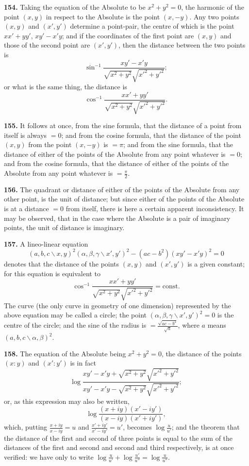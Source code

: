 \documentclass[11pt,a4paper]{book}
\begin{document}
\begin{center}
\textbf{154.} Taking the equation of the Absolute to be $x^2+y^2=0$, the harmonic of
the point $(x,y)$ in respect to the Absolute is the point $(x,-y)$. Any two points
$(x,y)$ and $(x',y')$ determine a point-pair, the centre of which is the point
$xx'+yy'$, $xy'-x'y$; and if the coordinates of the first point are $(x,y)$ and those of the
second point are $(x',y')$, then the distance between the two points is
\[
\sin^{-1}\frac{xy'-x'y}{\sqrt{x^2+y^2}\sqrt{x'^2+y'^2}};
\]
or what is the same thing, the distance is
\[
\cos^{-1}\frac{xx'+yy'}{\sqrt{x^2+y^2}\sqrt{x'^2+y'^2}}.
\]

\textbf{155.} It follows at once, from the sine formula, that the distance of a point
from itself is always $=0$; and from the cosine formula, that the distance of the point
$(x,y)$ from the point $(x,-y)$ is $=\pi$; and from the sine formula, that the distance
of either of the points of the Absolute from any point whatever is $=0$; and from the
cosine formula, that the distance of either of the points of the Absolute from any point
whatever is $=\frac{\pi}{2}$.

\textbf{156.} The quadrant or distance of either of the points of the Absolute from any
other point, is the unit of distance; but since either of the points of the Absolute is at
a distance $=0$ from itself, there is here a certain apparent inconsistency. It may be
observed, that in the case where the Absolute is a pair of imaginary points, the unit of
distance is imaginary.

\textbf{157.} A lineo-linear equation
\[
(a,b,c\!\backslash x,y)^2(\alpha,\beta,\gamma\!\backslash x',y')^2-(ac-b^2)(xy'-x'y)^2=0
\]
denotes that the distance of the points $(x,y)$ and $(x',y')$ is a given constant; for this
equation is equivalent to
\[
\cos^{-1}\frac{xx'+yy'}{\sqrt{x^2+y^2}\sqrt{x'^2+y'^2}}=\text{const.}
\]
The curve (the only curve in geometry of one dimension) represented by the above
equation may be called a circle; the point $(\alpha,\beta,\gamma\!\backslash x',y')^2=0$ is the centre of the circle;
and the sine of the radius is $=\frac{\sqrt{ac-b^2}}{\sqrt{a}}$, where $a$ means $(a,b,c\!\backslash \alpha,\beta)^2$.

\textbf{158.} The equation of the Absolute being $x^2+y^2=0$, the distance of the points
$(x:y)$ and $(x':y')$ is in fact
\[
\log\frac{xy'-x'y+\sqrt{x^2+y^2}\sqrt{x'^2+y'^2}}{xy'-x'y-\sqrt{x^2+y^2}\sqrt{x'^2+y'^2}};
\]
or, as this expression may also be written,
\[
\log\frac{(x+iy)(x'-iy')}{(x-iy)(x'+iy')},
\]
which, putting $\frac{x+iy}{x-iy}=u$ and $\frac{x'+iy'}{x'-iy'}=u'$, becomes $\log\frac{u}{u'}$; and the theorem that
the distance of the first and second of three points is equal to the sum of the distances
of the first and second and second and third respectively, is at once verified: we have
only to write $\log\frac{u}{u'} + \log\frac{u'}{u''} = \log\frac{u}{u''}$.


\end{center}
\end{document}
